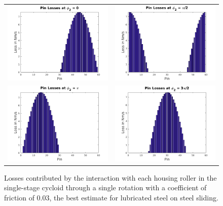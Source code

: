 \begin{figure}[t]
   \centering
   \begin{tabular}{cc}
	   \includegraphics[width=0.48\linewidth]{fig/single_power_0} &
	   \includegraphics[width=0.48\linewidth]{fig/single_power_pi2} \\
	   \includegraphics[width=0.48\linewidth]{fig/single_power_pi} &
	   \includegraphics[width=0.48\linewidth]{fig/single_power_3pi2}
   \end{tabular}
   \caption{Losses contributed by the interaction with each housing roller in the single-stage cycloid through a single rotation with a coefficient of friction of 0.03, the best estimate for lubricated steel on steel sliding.}
   \label{fig:single_losses}
\end{figure}

